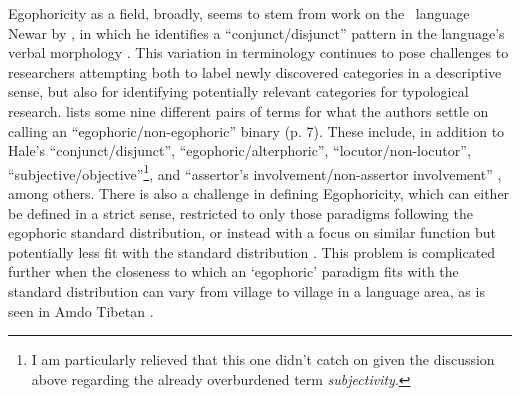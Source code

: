 Egophoricity as a field, broadly, seems to stem from work on the \lfam\ language Newar by , in which he identifies a ``conjunct/disjunct'' pattern in the language's verbal morphology \cite{EgoIntro}. This variation in terminology continues to pose challenges to researchers attempting both to label newly discovered categories in a descriptive sense, but also for identifying potentially relevant categories for typological research.  lists some nine different pairs of terms for what the authors settle on calling an ``egophoric/non-egophoric'' binary (p. 7). These include, in addition to Hale's ``conjunct/disjunct'', ``egophoric/alterphoric'', ``locutor/non-locutor'', ``subjective/objective''\footnote{I am particularly relieved that this one didn't catch on given the discussion above regarding the already overburdened term \textit{subjectivity}.}, and ``assertor's involvement/non-assertor involvement'' \cite[8]{EgoIntro}, among others. There is also a challenge in defining Egophoricity, which can either be defined in a strict sense, restricted to only those paradigms following the egophoric standard distribution, or instead with a focus on similar function but potentially less fit with the standard distribution \cite{EgoIntro}. This problem is complicated further when the closeness to which an `egophoric' paradigm fits with the standard distribution can vary from village to village in a language area, as is seen in Amdo Tibetan \cite{Tribur2019}.

